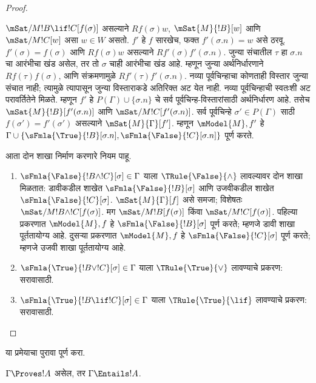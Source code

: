 \documentclass[../../../include/open-logic-section]{subfiles}
\begin{document}
\begin{proof}
\begin{enumerate}
  $\mSat/{M}{!B \lif !C}[f(\sigma)]$
  असल्याने $Rf(\sigma)w$,
  $\mSat{M}{!B}[w]$ आणि
  $\mSat/{M}{!C}[w]$
  असा $w \in W$ असतो.
  $f'$ हे $f$ सारखेच, फक्त
  $f'(\sigma.n) = w$
  असे ठरवू. $f'(\sigma) = f(\sigma)$
  आणि $Rf(\sigma)w$ असल्याने $Rf'(\sigma)f'(\sigma.n)$.
  जुन्या संचातील $\tau$ हा $\sigma.n$ चा आरंभीचा खंड
  असेल, तर तो $\sigma$ चाही आरंभीचा खंड आहे.
  म्हणून जुन्या अर्थनिर्धारणाने $Rf(\tau)f(\sigma)$,
  आणि संक्रमणामुळे $Rf'(\tau)f'(\sigma.n)$.
  नव्या पूर्वचिन्हाचा कोणताही विस्तार जुन्या संचात नाही;
  त्यामुळे त्यापासून जुन्या विस्ताराकडे अतिरिक्त अट येत नाही.
  नव्या पूर्वचिन्हाची स्वतःशी अट परावर्तितेने मिळते.
  म्हणून $f'$ हे $P(\Gamma)\cup\{\sigma.n\}$ चे
  सर्व पूर्वचिन्ह-विस्तारांसाठी अर्थनिर्धारण आहे.
  तसेच $\mSat{M}{!B}[f'(\sigma.n)]$
  आणि $\mSat/{M}{!C}[f'(\sigma.n)]$.
  सर्व पूर्वचिन्हे
  $\sigma' \in P(\Gamma)$ साठी
  $f(\sigma') = f'(\sigma')$
  असल्याने
  $\mSat{M}{\Gamma}[f']$.
  म्हणून $\mModel{M}, f'$ हे
  $\Gamma \cup
  \{\sFmla{\True}{!B}[\sigma.n],
  \sFmla{\False}{!C}[\sigma.n]\}$
  पूर्ण करते.
\end{enumerate}
आता दोन शाखा निर्माण करणारे
नियम पाहू.
\begin{enumerate}
\item $\sFmla{\False}{!B \land !C}[\sigma] \in \Gamma$
  याला $\TRule{\False}{\land}$
  लावल्यावर दोन शाखा मिळतात:
  डावीकडील शाखेत
  $\sFmla{\False}{!B}[\sigma]$
  आणि उजवीकडील शाखेत
  $\sFmla{\False}{!C}[\sigma]$.
  $\mSat{M}{\Gamma}[f]$
  असे समजा; विशेषतः
  $\mSat/{M}{!B \land !C}[f(\sigma)]$.
  मग $\mSat/{M}{!B}[f(\sigma)]$
  किंवा $\mSat/{M}{!C}[f(\sigma)]$.
  पहिल्या प्रकरणात
  $\mModel{M}, f$ हे
  $\sFmla{\False}{!B}[\sigma]$
  पूर्ण करते; म्हणजे डावी
  शाखा पूर्ततायोग्य आहे.
  दुसऱ्या प्रकरणात
  $\mModel{M}, f$ हे
  $\sFmla{\False}{!C}[\sigma]$
  पूर्ण करते; म्हणजे उजवी
  शाखा पूर्ततायोग्य आहे.
\item $\sFmla{\True}{!B \lor !C}[\sigma] \in \Gamma$
  याला $\TRule{\True}{\lor}$
  लावण्याचे प्रकरण: सरावासाठी.
\item $\sFmla{\True}{!B \lif !C}[\sigma] \in \Gamma$
  याला $\TRule{\True}{\lif}$
  लावण्याचे प्रकरण: सरावासाठी.
\end{enumerate}
\end{proof}

\begin{prob}
या प्रमेयाचा पुरावा पूर्ण करा.
\end{prob}

\begin{cor}
$\Gamma \Proves !A$ असेल,
तर $\Gamma \Entails !A$.
\end{cor}
\end{document}

